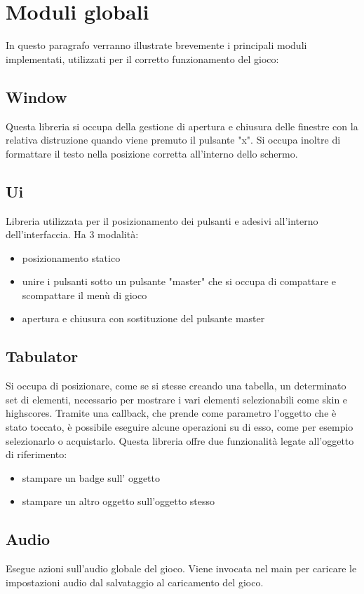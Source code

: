 \documentclass[15pt]{article}
\begin{document}
\section{Moduli globali}
In questo paragrafo verranno illustrate brevemente i principali moduli implementati, utilizzati per il corretto funzionamento del gioco:
\\
\subsection{Window}
Questa libreria si occupa della gestione di apertura e chiusura delle finestre con la relativa distruzione quando viene premuto il pulsante "x". Si occupa inoltre di formattare il testo nella posizione corretta all'interno dello schermo.
\subsection{Ui}
Libreria utilizzata per il posizionamento dei pulsanti e adesivi all'interno dell'interfaccia. Ha 3 modalità:
            \begin{itemize}
                \item posizionamento statico 
                \item unire i pulsanti sotto un pulsante "master" che si occupa di compattare e scompattare il menù di gioco
                \item apertura e chiusura con sostituzione del pulsante master
            \end{itemize}
\subsection{Tabulator} 
Si occupa di posizionare, come se si stesse creando una tabella, un determinato set di elementi, necessario per mostrare i vari elementi selezionabili come skin e highscores. Tramite una callback, che prende come parametro l'oggetto che è stato toccato, è possibile eseguire alcune operazioni su di esso, come per esempio selezionarlo o acquistarlo. Questa libreria offre due funzionalità legate all'oggetto di riferimento:
        \begin{itemize}
            \item stampare un badge sull’ oggetto
            \item stampare un altro oggetto sull'oggetto stesso
        \end{itemize}
\subsection{Audio} 
Esegue azioni sull'audio globale del gioco. Viene invocata nel main per caricare le impostazioni audio dal salvataggio al caricamento del gioco.
\end{document}
